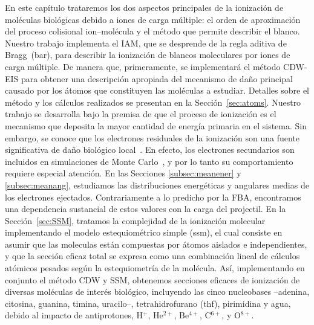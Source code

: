En este capítulo trataremos los dos aspectos principales de la ionización 
de moléculas biológicas debido a iones de carga múltiple: el orden de 
aproximación del proceso colisional ion--molécula y el método que permite
describir el blanco. Nuestro trabajo implementa el IAM, que se desprende 
de la regla aditiva de Bragg~(\acs{bar}), para describir la ionización de 
blancos moleculares por iones de carga múltiple. De manera que, 
primeramente, se implementará el método CDW-EIS para obtener una 
descripción apropiada del mecanismo de daño principal causado por los 
átomos que constituyen las moléculas a estudiar. Detalles sobre el método 
y los cálculos realizados se presentan en la Sección~\ref{sec:atoms}. 
Nuestro trabajo se desarrolla bajo la premisa de que el proceso de 
ionización es el mecanismo que deposita la mayor cantidad de energía 
primaria en el sistema. Sin embargo, se conoce que los electrones 
residuales de la ionización son una fuente significativa de daño 
biológico local~\cite{Denifl:11}. En efecto, los electrones secundarios 
son incluidos en simulaciones de Monte Carlo~\cite{Champion:16,Quinto:17,
Acocer-Avila:19}, y por lo tanto su comportamiento requiere especial 
atención. En las Secciones \ref{subsec:meanener} y \ref{subsec:meanang}, 
estudiamos las distribuciones energéticas y angulares medias de los 
electrones ejectados. Contrariamente a lo predicho por la FBA, 
encontramos una dependencia sustancial de estos valores con la carga del 
projectil. En la Sección~\ref{sec:SSM}, tratamos la complejidad de la 
ionización molecular implementando el modelo estequiométrico simple 
(\acs{ssm}), el cual consiste en asumir que las moleculas están 
compuestas por átomos aislados e independientes, y que la sección eficaz 
total se expresa como una combinación lineal de cálculos atómicos pesados 
según la estequiometría de la molécula. Así, implementando en conjunto el 
método CDW y SSM, obtenemos secciones eficaces de ionización de diversas 
moléculas de interés biológico, incluyendo las cinco nucleobases 
--adenina, citosina, guanina, timina, uracilo--, tetrahidrofurano 
(\acs{thf}), pirimidina y agua, debido al impacto de antiprotones, 
H$^{+}$, He$^{2+}$, Be$^{4+}$, C$^{6+}$, y O$^{8+}$. 


